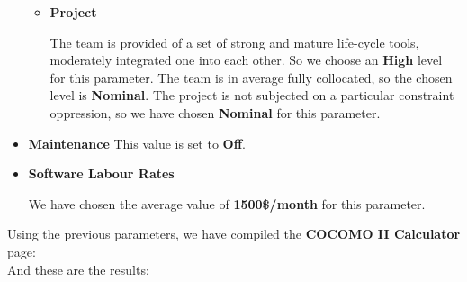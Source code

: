 \begin{itemize}
\begin{itemize}
\begin{itemize}
		\end{itemize}
		\item \textbf{Project}
		\begin{itemize}
			 The team is provided of a set of strong and mature life-cycle tools, moderately integrated one into each other. So we choose an \textbf{High} level for this parameter.
			 The team is in average fully collocated, so the chosen level is \textbf{Nominal}.
			 The project is not subjected on a particular constraint oppression, so we have chosen \textbf{Nominal} for this parameter.
		\end{itemize}
	\end{itemize}
	\item \textbf{Maintenance} This value is set to \textbf{Off}.
	\item \textbf{Software Labour Rates}
	\begin{itemize}
		 We have chosen the average value of \textbf{1500\$/month} for this parameter.
	\end{itemize}	
\end{itemize}
\newpage
Using the previous parameters, we have compiled the \textbf{COCOMO II Calculator} page:\\
And these are the results:\\
\label{fig:1}
%